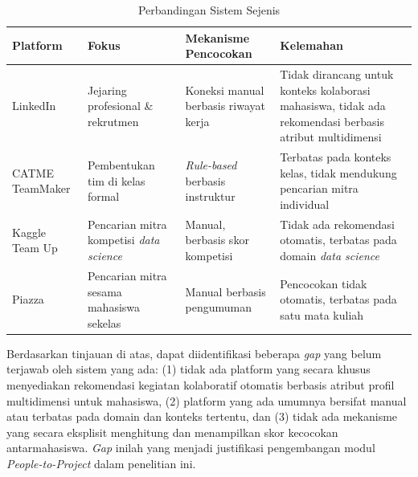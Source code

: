 \begin{table}[H]
  \centering
  \caption{Perbandingan Sistem Sejenis}
  \label{tab:tinjauan-sistem}
  \begin{tabularx}{\textwidth}{p{2.2cm} p{2.8cm} p{3cm} X}
    \toprule
    \textbf{Platform} & \textbf{Fokus} & \textbf{Mekanisme Pencocokan} & \textbf{Kelemahan} \\
    \midrule
    LinkedIn & Jejaring profesional \& rekrutmen & Koneksi manual berbasis riwayat kerja & Tidak dirancang untuk konteks kolaborasi mahasiswa, tidak ada rekomendasi berbasis atribut multidimensi \\
    \midrule
    CATME TeamMaker & Pembentukan tim di kelas formal & \emph{Rule-based} berbasis instruktur & Terbatas pada konteks kelas, tidak mendukung pencarian mitra individual \\
    \midrule
    Kaggle Team Up & Pencarian mitra kompetisi \emph{data science} & Manual, berbasis skor kompetisi & Tidak ada rekomendasi otomatis, terbatas pada domain \emph{data science} \\
    \midrule
    Piazza & Pencarian mitra sesama mahasiswa sekelas & Manual berbasis pengumuman & Pencocokan tidak otomatis, terbatas pada satu mata kuliah \\
    \bottomrule
  \end{tabularx}
\end{table}

Berdasarkan tinjauan di atas, dapat diidentifikasi beberapa \emph{gap} yang belum terjawab oleh sistem yang ada: (1) tidak ada platform yang secara khusus menyediakan rekomendasi kegiatan kolaboratif otomatis berbasis atribut profil multidimensi untuk mahasiswa, (2) platform yang ada umumnya bersifat manual atau terbatas pada domain dan konteks tertentu, dan (3) tidak ada mekanisme yang secara eksplisit menghitung dan menampilkan skor kecocokan antarmahasiswa. \emph{Gap} inilah yang menjadi justifikasi pengembangan modul \emph{People-to-Project} dalam penelitian ini.
